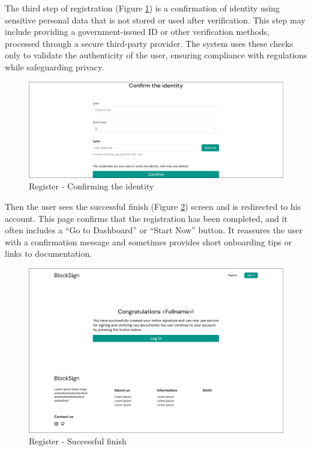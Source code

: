 The third step of registration (Figure \ref{registerstep3}) is a confirmation of identity using sensitive personal data that is not stored or used after verification. 
This step may include providing a government-issued ID or other verification methods, processed through a secure third-party provider. 
The system uses these checks only to validate the authenticity of the user, ensuring compliance with regulations while safeguarding privacy. 

\begin{figure}[H]
    \centering
    \includegraphics[width=18cm]{"images/figmaUI/register3-crop.png"}
    \caption{Register - Confirming the identity}
    \label{registerstep3}
\end{figure}

\newpage
Then the user sees the successful finish (Figure \ref{successregister}) screen and is redirected to his account. 
This page confirms that the registration has been completed, and it often includes a ``Go to Dashboard'' or ``Start Now'' button. 
It reassures the user with a confirmation message and sometimes provides short onboarding tips or links to documentation.

\begin{figure}[H]
    \centering
    \includegraphics[width=18cm]{"images/figmaUI/successregister.png"}
    \caption{Register - Successful finish}
    \label{successregister}
\end{figure}

